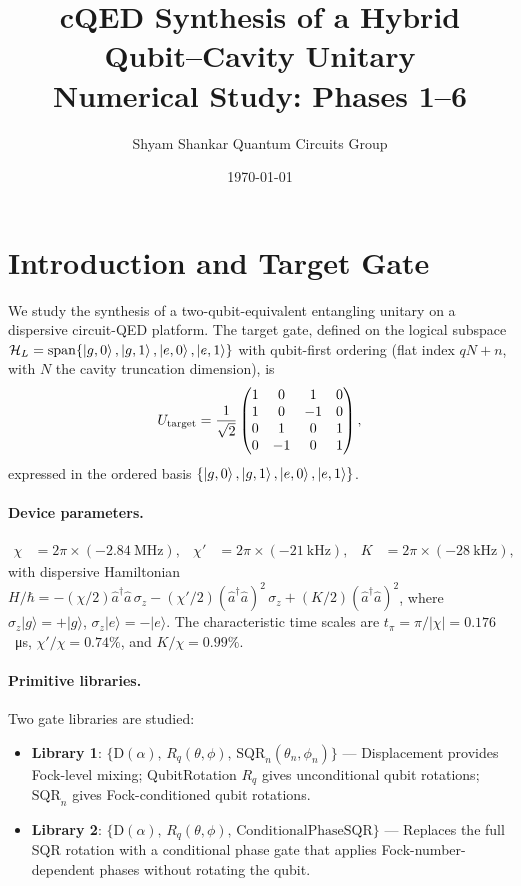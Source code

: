 \documentclass[11pt,a4paper]{article}
\title{\textbf{cQED Synthesis of a Hybrid Qubit--Cavity Unitary}\\[6pt]
\large Numerical Study: Phases 1--6}
\author{Shyam Shankar Quantum Circuits Group}
\date{\today}
\newcommand{\Utarget}{U_{\rm target}}
\newcommand{\SQR}{\mathrm{SQR}}
\newcommand{\disp}{\mathrm{D}}
\begin{document}
\maketitle
\tableofcontents
\newpage

\section{Introduction and Target Gate}

We study the synthesis of a two-qubit-equivalent entangling unitary on a
dispersive circuit-QED platform.  The target gate, defined on the logical
subspace $\mathcal{H}_L = \mathrm{span}\{\ket{g,0},\ket{g,1},\ket{e,0},\ket{e,1}\}$
with qubit-first ordering (flat index $q N + n$, with $N$ the cavity truncation
dimension), is
\begin{equation}
  \Utarget = \frac{1}{\sqrt{2}}
  \begin{pmatrix} 1 & 0 & 1 & 0 \\ 1 & 0 & -1 & 0 \\
                  0 & 1 & 0 & 1 \\ 0 & -1 & 0 & 1 \end{pmatrix},
  \label{eq:utarget}
\end{equation}
expressed in the ordered basis $\{\ket{g,0},\ket{g,1},\ket{e,0},\ket{e,1}\}$.

\paragraph{Device parameters.}
\begin{align*}
  \chi  &= 2\pi\times(-2.84~\text{MHz}), &
  \chi' &= 2\pi\times(-21~\text{kHz}),  &
  K     &= 2\pi\times(-28~\text{kHz}),
\end{align*}
with dispersive Hamiltonian
$H/\hbar = -(\chi/2)\hat{a}^\dagger\hat{a}\,\sigma_z
           - (\chi'/2)(\hat{a}^\dagger\hat{a})^2\,\sigma_z
           + (K/2)(\hat{a}^\dagger\hat{a})^2$,
where $\sigma_z|g\rangle=+|g\rangle$, $\sigma_z|e\rangle=-|e\rangle$.
The characteristic time scales are $t_\pi = \pi/|\chi| = 0.176$~\si{\micro s},
$\chi'/\chi = 0.74\%$, and $K/\chi = 0.99\%$.

\paragraph{Primitive libraries.}
Two gate libraries are studied:
\begin{itemize}
  \item \textbf{Library 1}: $\{\disp(\alpha),\,R_q(\theta,\phi),\,\SQR_n(\theta_n,\phi_n)\}$
        — Displacement provides Fock-level mixing; QubitRotation $R_q$ gives
        unconditional qubit rotations; $\SQR_n$ gives Fock-conditioned qubit rotations.
  \item \textbf{Library 2}: $\{\disp(\alpha),\,R_q(\theta,\phi),\,\text{ConditionalPhaseSQR}\}$
        — Replaces the full SQR rotation with a conditional phase gate that applies
        Fock-number-dependent phases without rotating the qubit.
\end{itemize}
\end{document}
